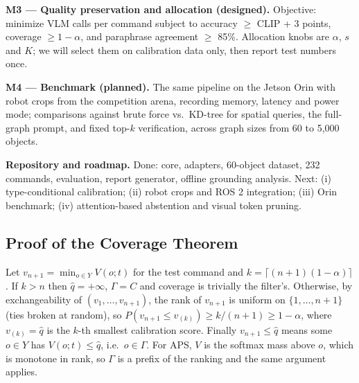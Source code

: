 \documentclass[conference]{IEEEtran}
\newcommand{\cset}{\Gamma}
\begin{document}
\textbf{M3 --- Quality preservation and allocation (designed).} Objective: minimize VLM calls per command subject
to accuracy $\ge$ CLIP + 3 points, coverage $\ge 1-\alpha$, and paraphrase agreement $\ge$ 85\%. Allocation knobs
are $\alpha$, $s$ and $K$; we will select them on calibration data only, then report test numbers once.

\textbf{M4 --- Benchmark (planned).} The same pipeline on the Jetson Orin with robot crops from the competition
arena, recording memory, latency and power mode; comparisons against brute force vs.\ KD-tree for spatial queries,
the full-graph prompt, and fixed top-$k$ verification, across graph sizes from 60 to 5{,}000 objects.

\textbf{Repository and roadmap.} Done: core, adapters, 60-object dataset, 232 commands, evaluation, report generator,
offline grounding analysis. Next: (i) type-conditional calibration; (ii) robot crops and ROS 2 integration;
(iii) Orin benchmark; (iv) attention-based abstention and visual token pruning.




\appendix

\subsection{Proof of the Coverage Theorem}
Let $v_{n+1}=\min_{o\in Y}V(o;t)$ for the test command and $k=\lceil(n+1)(1-\alpha)\rceil$. If $k>n$ then
$\hat q=+\infty$, $\cset=C$ and coverage is trivially the filter's. Otherwise, by exchangeability of
$(v_1,\dots,v_{n+1})$, the rank of $v_{n+1}$ is uniform on $\{1,\dots,n+1\}$ (ties broken at random), so
$P(v_{n+1}\le v_{(k)})\ge k/(n+1)\ge1-\alpha$, where $v_{(k)}=\hat q$ is the $k$-th smallest calibration score.
Finally $v_{n+1}\le\hat q$ means some $o\in Y$ has $V(o;t)\le\hat q$, i.e.\ $o\in\cset$. For APS, $V$ is the softmax mass
above $o$, which is monotone in rank, so $\cset$ is a prefix of the ranking and the same argument applies.
\end{document}
